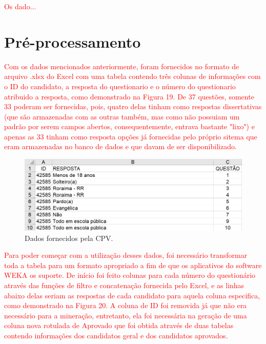 \label{chapter:projeto}

\par
\textcolor{red}{Os dado...}

\section{Pré-processamento}

\par
\textcolor{red}{Com os dados mencionados anteriormente, foram fornecidos no formato de arquivo .xlsx do Excel com uma tabela contendo três colunas de informações com o ID do candidato, a resposta do questionario e o número do questionario atribuido a resposta, como demonstrado na Figura 19. De 37 questões, somente 33 poderam ser fornecidas, pois, quatro delas tinham como respostas dissertativas (que são armazenadas com as outras também, mas como não possuiam um padrão por serem campos abertos, consequentemente, entrava bastante "lixo") e apenas as 33 tinham como resposta opções já fornecidas pelo próprio sitema que eram armazenadas no banco de dados e que davam de ser disponibilizado.}

\par
\begin{figure}[!htp]
	\begin{center}
    \caption{\label{fig:waveform_fig} Dados fornecidos pela CPV.}
	\includegraphics[scale=0.65]{Figuras/Formato_errado.png}
	\end{center}
\end{figure}

\par
\textcolor{red}{Para poder começar com a utilização desses dados, foi necessário transformar toda a tabela para um formato apropriado a fim de que os aplicativos do software WEKA os suporte. De início foi feito colunas para cada número do questionário através das funções de filtro e concatenação fornecida pelo Excel, e as linhas abaixo delas seriam as respostas de cada candidato para aquela coluna especifica, como demonstrado na Figura 20. A coluna de ID foi removida já que não era necessário para a mineração, entretanto, ela foi necessária na geração de uma coluna nova rotulada de Aprovado que foi obtida através de duas tabelas contendo informações dos candidatos geral e dos candidatos aprovados.}

